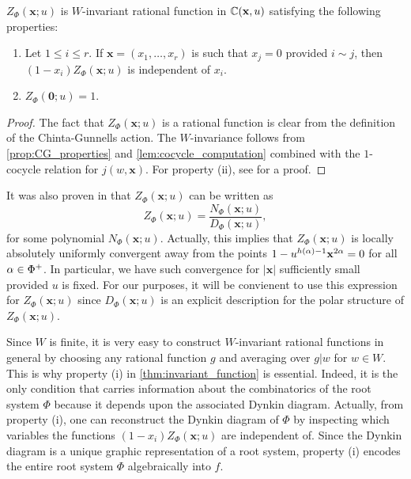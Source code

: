 \documentclass[12pt,reqno,oneside]{amsart}
\begin{document}
        \begin{theorem}\label{thm:invariant_function}
            $Z_{\Phi}(\mathbf{x};u)$ is $W$-invariant rational function in $\mathbb{C}(\mathbf{x},u)$ satisfying the following properties:
            \begin{enumerate}[label=(\roman*)]
                \item Let $1 \le i \le r$. If $\mathbf{x} = (x_{1},\ldots,x_{r})$ is such that $x_{j} = 0$ provided $i \sim j$, then $(1-x_{i})Z_{\Phi}(\mathbf{x};u)$ is independent of $x_{i}$.
                \item $Z_{\Phi}(\mathbf{0};u) = 1$.
            \end{enumerate}
        \end{theorem}
        \begin{proof}
            The fact that $Z_{\Phi}(\mathbf{x};u)$ is a rational function is clear from the definition of the Chinta-Gunnells action. The $W$-invariance follows from \cref{prop:CG_properties} and \cref{lem:cocycle_computation} combined with the $1$-cocycle relation for $j(w,\mathbf{x})$. For property (ii), see \cite{CFG} for a proof.
        \end{proof}

        It was also proven in \cite{CFG} that $Z_{\Phi}(\mathbf{x};u)$ can be written as
        \[
            Z_{\Phi}(\mathbf{x};u) = \frac{N_{\Phi}(\mathbf{x};u)}{D_{\Phi}(\mathbf{x};u)},
        \]
        for some polynomial $N_{\Phi}(\mathbf{x};u)$. Actually, this implies that $Z_{\Phi}(\mathbf{x};u)$ is locally absolutely uniformly convergent away from the points $1-u^{h(\alpha)-1}\mathbf{x}^{2\alpha} = 0$ for all $\alpha \in \Phi^{+}$. In particular, we have such convergence for $|\mathbf{x}|$ sufficiently small provided $u$ is fixed. For our purposes, it will be convienent to use this expression for $Z_{\Phi}(\mathbf{x};u)$ since $D_{\Phi}(\mathbf{x};u)$ is an explicit description for the polar structure of $Z_{\Phi}(\mathbf{x};u)$.
        
        \begin{remark}
            Since $W$ is finite, it is very easy to construct $W$-invariant rational functions in general by choosing any rational function $g$ and averaging over $g|w$ for $w \in W$. This is why property (i) in \cref{thm:invariant_function} is essential. Indeed, it is the only condition that carries information about the combinatorics of the root system $\Phi$ because it depends upon the associated Dynkin diagram. Actually, from property (i), one can reconstruct the Dynkin diagram of $\Phi$ by inspecting which variables the functions $(1-x_{i})Z_{\Phi}(\mathbf{x};u)$ are independent of. Since the Dynkin diagram is a unique graphic representation of a root system, property (i) encodes the entire root system $\Phi$ algebraically into $f$.
        \end{remark}
\end{document}

